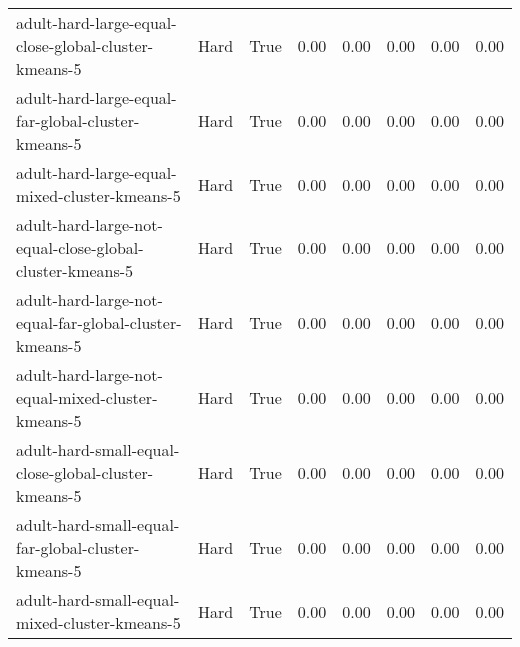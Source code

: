 \begin{longtable}{llllllll}
\bottomrule
\endlastfoot
                                   adult-hard-large-equal-close-global-cluster-kmeans-5 &         Hard &        True &                 0.00 &                 0.00 &                         0.00 &                         0.00 &                         0.00 \\
                                     adult-hard-large-equal-far-global-cluster-kmeans-5 &         Hard &        True &                 0.00 &                 0.00 &                         0.00 &                         0.00 &                         0.00 \\
                                          adult-hard-large-equal-mixed-cluster-kmeans-5 &         Hard &        True &                 0.00 &                 0.00 &                         0.00 &                         0.00 &                         0.00 \\
                               adult-hard-large-not-equal-close-global-cluster-kmeans-5 &         Hard &        True &                 0.00 &                 0.00 &                         0.00 &                         0.00 &                         0.00 \\
                                 adult-hard-large-not-equal-far-global-cluster-kmeans-5 &         Hard &        True &                 0.00 &                 0.00 &                         0.00 &                         0.00 &                         0.00 \\
                                      adult-hard-large-not-equal-mixed-cluster-kmeans-5 &         Hard &        True &                 0.00 &                 0.00 &                         0.00 &                         0.00 &                         0.00 \\
                                   adult-hard-small-equal-close-global-cluster-kmeans-5 &         Hard &        True &                 0.00 &                 0.00 &                         0.00 &                         0.00 &                         0.00 \\
                                     adult-hard-small-equal-far-global-cluster-kmeans-5 &         Hard &        True &                 0.00 &                 0.00 &                         0.00 &                         0.00 &                         0.00 \\
                                          adult-hard-small-equal-mixed-cluster-kmeans-5 &         Hard &        True &                 0.00 &                 0.00 &                         0.00 &                         0.00 &                         0.00 \\

\end{longtable}
